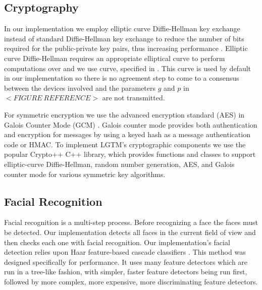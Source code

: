 \documentclass[12pt]{report}
\begin{document}
\subsection{Cryptography}
In our implementation we employ elliptic curve Diffie-Hellman key exchange instead of standard Diffie-Hellman key exchange to reduce the number of bits required for the public-private key pairs, thus increasing performance \cite{FastEllipticCurveDiffieHellmanBernstein2006}. Elliptic curve Diffie-Hellman requires an appropriate elliptical curve to perform computations over and we use curve, specified in \cite{EllipticCurvesStandard2009}. This curve is used by default in our implementation so there is no agreement step to come to a consensus between the devices involved and the parameters $g$ and $p$ in $<FIGURE \: REFERENCE>$ are not transmitted. \par

For symmetric encryption we use the advanced encryption standard (AES) \cite{AesNist2001} in Galois Counter Mode (GCM) \cite{GcmModeMcGrewNist2005}. Galois counter mode provides both authentication and encryption for messages by using a keyed hash as a message authentication code or HMAC. To implement LGTM's cryptographic components we use the popular Crypto++ C++ library, which provides functions and classes to support elliptic-curve Diffie-Hellman, random number generation, AES, and Galois counter mode for various symmetric key algorithms. \par

\subsection{Facial Recognition}
Facial recognition is a multi-step process. Before recognizing a face the faces must be detected. Our implementation detects all faces in the current field of view and then checks each one with facial recognition. Our implementation's facial detection relies upon Haar feature-based cascade classifiers \cite{HaarCascadeViola2001}. This method was designed specifically for performance. It uses many feature detectors which are run in a tree-like fashion, with simpler, faster feature detectors being run first, followed by more complex, more expensive, more discriminating feature detectors. \par
\end{document}
